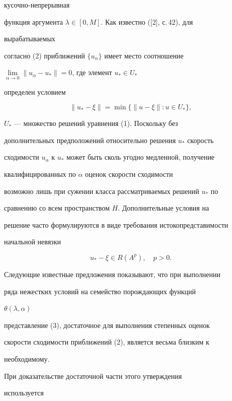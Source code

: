 кусочно-непрерывная 


функция аргумента $\lambda\in[0,M]$. Как известно ([2], с.\,42), для 


вырабатываемых 


согласно (2) приближений $\{u_\alpha\}$ имеет место соотношение 


$\lim\limits_{\alpha\to0}\|u_\alpha-u_*\|=0$, где элемент $u_*\in U_*$ 


определен условием 


$$ 


\|u_*-\xi\|=\min\{\|u-\xi\|:u\in U_*\}, 


$$ 


$U_*$ --- множество решений уравнения (1). Поскольку без 


дополнительных предположений относительно решения $u_*$ скорость 


сходимости $u_\alpha$ к $u_*$ может быть сколь угодно медленной, получение


квалифицированных по $\alpha$ оценок скорости сходимости 


возможно лишь при сужении класса рассматриваемых решений $u_*$ по 


сравнению со всем пространством $H$. Дополнительные условия на 


решение часто формулируются в виде требования истокопредставимости 


начальной невязки 


\begin{equation} 


u_*-\xi\in R(A^p),\quad p>0. 


\end{equation} 


Следующие известные предложения показывают, что при выполнении 


ряда нежестких условий на семейство порождающих функций 


$\theta(\lambda,\alpha)$ 


представление (3), достаточное для выполнения степенных оценок 


скорости сходимости приближений (2), является весьма близким к 


необходимому. 


При доказательстве достаточной части этого утверждения 


используется 


\medskip 


 


